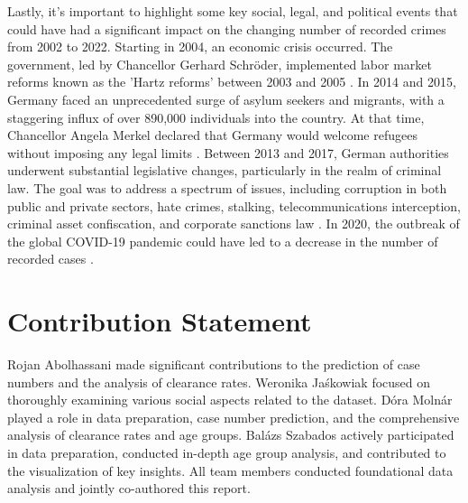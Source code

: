 \documentclass{article}
\theoremstyle{plain}
\theoremstyle{definition}
\theoremstyle{remark}
\begin{document}
Lastly, it's important to highlight some key social, legal, and political events that could have had a significant impact on the changing number of recorded crimes from 2002 to 2022. Starting in 2004, an economic crisis occurred. The government, led by Chancellor Gerhard Schröder, implemented labor market reforms known as the 'Hartz reforms' between 2003 and 2005 \cite{financialcrisis, angrygermans}.  
In 2014 and 2015, Germany faced an unprecedented surge of asylum seekers and migrants, with a staggering influx of over 890,000 individuals into the country. At that time, Chancellor Angela Merkel declared that Germany would welcome refugees without imposing any legal limits \cite{sola,wassmer}. Between 2013 and 2017, German authorities underwent substantial legislative changes, particularly in the realm of criminal law. The goal was to address a spectrum of issues, including corruption in both public and private sectors, hate crimes, stalking, telecommunications interception, criminal asset confiscation, and corporate sanctions law \cite{wassmer}. In 2020, the outbreak of the global COVID-19 pandemic could have led to a decrease in the number of recorded cases \cite{covid_influence}. 

\section*{Contribution Statement}

Rojan Abolhassani made significant contributions to the prediction of case numbers and the analysis of clearance rates. Weronika Jaśkowiak focused on thoroughly examining various social aspects related to the dataset. Dóra Molnár played a role in data preparation, case number prediction, and the comprehensive analysis of clearance rates and age groups. Balázs Szabados actively participated in data preparation, conducted in-depth age group analysis, and contributed to the visualization of key insights. All team members conducted foundational data analysis and jointly co-authored this report.




\end{document}
